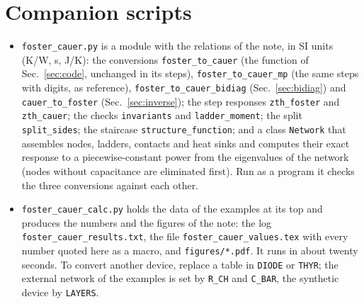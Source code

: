 \documentclass[10pt,a4paper]{scrartcl}
\newcommand{\code}[1]{\texttt{#1}}
\begin{document}
\appendix
\section{Companion scripts}
\label{sec:scripts}
\begin{itemize}
\item \code{foster\_cauer.py} is a module with the relations of the note, in SI units (K/W, s, J/K): the conversions \code{foster\_to\_cauer} (the function of Sec.~\ref{sec:code}, unchanged in its steps), \code{foster\_to\_cauer\_mp} (the same steps with \fcmpDigits{} digits, as reference), \code{foster\_to\_cauer\_bidiag} (Sec.~\ref{sec:bidiag}) and \code{cauer\_to\_foster} (Sec.~\ref{sec:inverse}); the step responses \code{zth\_foster} and \code{zth\_cauer}; the checks \code{invariants} and \code{ladder\_moment}; the split \code{split\_sides}; the staircase \code{structure\_function}; and a class \code{Network} that assembles nodes, ladders, contacts and heat sinks and computes their exact response to a piecewise-constant power from the eigenvalues of the network (nodes without capacitance are eliminated first). Run as a program it checks the three conversions against each other.
\item \code{foster\_cauer\_calc.py} holds the data of the examples at its top and produces the numbers and the figures of the note: the log \code{foster\_cauer\_results.txt}, the file \code{foster\_cauer\_values.tex} with every number quoted here as a macro, and \code{figures/*.pdf}. It runs in about twenty seconds. To convert another device, replace a table in \code{DIODE} or \code{THYR}; the external network of the examples is set by \code{R\_CH} and \code{C\_BAR}, the synthetic device by \code{LAYERS}.
\end{itemize}
\end{document}
